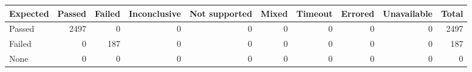 \begin{tabular}{lrrrrrrrrr}
\toprule
Expected & Passed & Failed & Inconclusive & Not supported & Mixed & Timeout & Errored & Unavailable & Total \\
\midrule
Passed & 2497 & 0 & 0 & 0 & 0 & 0 & 0 & 0 & 2497 \\
Failed & 0 & 187 & 0 & 0 & 0 & 0 & 0 & 0 & 187 \\
None & 0 & 0 & 0 & 0 & 0 & 0 & 0 & 0 & 0 \\
\bottomrule
\end{tabular}
